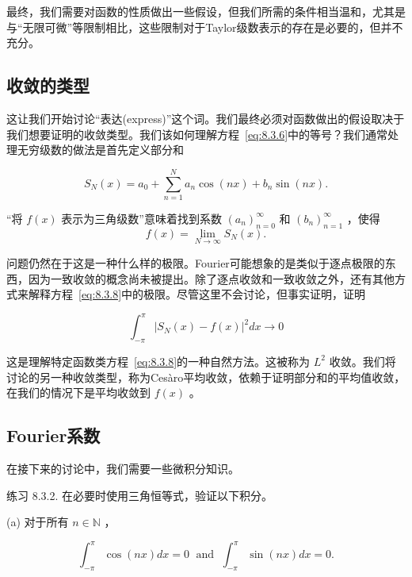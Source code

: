最终，我们需要对函数的性质做出一些假设，但我们所需的条件相当温和，尤其是与“无限可微”等限制相比，这些限制对于Taylor级数表示的存在是必要的，但并不充分。

\subsection{收敛的类型}

这让我们开始讨论“表达(express)”这个词。我们最终必须对函数做出的假设取决于我们想要证明的收敛类型。我们该如何理解方程~\eqref{eq:8.3.6}中的等号？我们通常处理无穷级数的做法是首先定义部分和

\begin{equation}
\label{eq:8.3.7}
{S}_{N}\left( x\right)  = {a}_{0} + \mathop{\sum }\limits_{{n = 1}}^{N}{a}_{n}\cos \left( {nx}\right)  + {b}_{n}\sin \left( {nx}\right) .
\end{equation}

“将 \(f\left( x\right)\) 表示为三角级数”意味着找到系数 \({\left( {a}_{n}\right) }_{n = 0}^{\infty }\) 和 \({\left( {b}_{n}\right) }_{n = 1}^{\infty }\) ，使得
\begin{equation}
\label{eq:8.3.8}
f\left( x\right)  = \mathop{\lim }\limits_{{N \rightarrow  \infty }}{S}_{N}\left( x\right) .
\end{equation}

问题仍然在于这是一种什么样的极限。Fourier可能想象的是类似于逐点极限的东西，因为一致收敛的概念尚未被提出。除了逐点收敛和一致收敛之外，还有其他方式来解释方程~\eqref{eq:8.3.8}中的极限。尽管这里不会讨论，但事实证明，证明

\[
{\int }_{-\pi }^{\pi }{\left| {S}_{N}\left( x\right)  - f\left( x\right) \right| }^{2}{dx} \rightarrow  0
\]

这是理解特定函数类方程~\eqref{eq:8.3.8}的一种自然方法。这被称为 \({L}^{2}\) 收敛。我们将讨论的另一种收敛类型，称为Ces\`aro平均收敛，依赖于证明部分和的平均值收敛，在我们的情况下是平均收敛到 \(f\left( x\right)\) 。

\subsection{Fourier系数}

在接下来的讨论中，我们需要一些微积分知识。

练习 8.3.2. 在必要时使用三角恒等式，验证以下积分。

(a) 对于所有 \(n \in  \mathbb{N}\) ，

\[
{\int }_{-\pi }^{\pi }\cos \left( {nx}\right) {dx} = 0\;\text{ and }\;{\int }_{-\pi }^{\pi }\sin \left( {nx}\right) {dx} = 0.
\]

